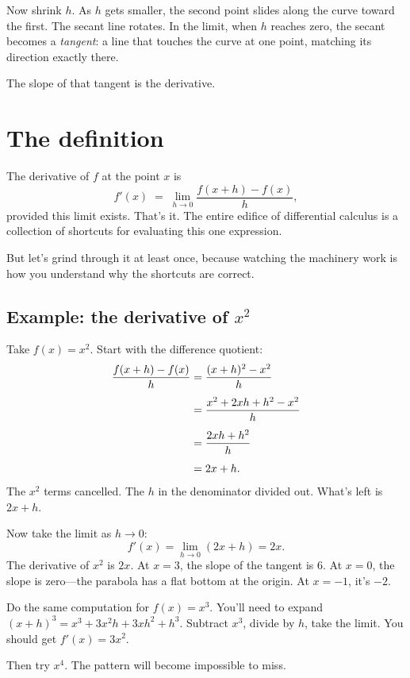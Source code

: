 Now shrink $h$. As $h$ gets smaller, the second point slides along the curve toward the first. The secant line rotates. In the limit, when $h$ reaches zero, the secant becomes a \emph{tangent}: a line that touches the curve at one point, matching its direction exactly there.

The slope of that tangent is the derivative.

\section{The definition}

The derivative of $f$ at the point $x$ is
\begin{equation}
  f'(x) \;=\; \lim_{h \to 0} \frac{f(x+h) - f(x)}{h},
  \label{eq:derivative-def}
\end{equation}
provided this limit exists. That's it. The entire edifice of differential calculus is a collection of shortcuts for evaluating this one expression.

But let's grind through it at least once, because watching the machinery work is how you understand why the shortcuts are correct.

\subsection{Example: the derivative of $x^2$}

Take $f(x) = x^2$. Start with the difference quotient:
\begin{align}
  \frac{f(x+h) - f(x)}{h}
    &= \frac{(x+h)^2 - x^2}{h} \notag \\[4pt]
    &= \frac{x^2 + 2xh + h^2 - x^2}{h} \notag \\[4pt]
    &= \frac{2xh + h^2}{h} \notag \\[4pt]
    &= 2x + h.
  \label{eq:x2-deriv}
\end{align}
The $x^2$ terms cancelled. The $h$ in the denominator divided out. What's left is $2x + h$.

Now take the limit as $h \to 0$:
\[
  f'(x) = \lim_{h \to 0} (2x + h) = 2x.
\]
The derivative of $x^2$ is $2x$. At $x = 3$, the slope of the tangent is $6$. At $x = 0$, the slope is zero---the parabola has a flat bottom at the origin. At $x = -1$, it's $-2$.

\begin{trythis}
Do the same computation for $f(x) = x^3$. You'll need to expand $(x+h)^3 = x^3 + 3x^2h + 3xh^2 + h^3$. Subtract $x^3$, divide by $h$, take the limit. You should get $f'(x) = 3x^2$.

Then try $x^4$. The pattern will become impossible to miss.
\end{trythis}

